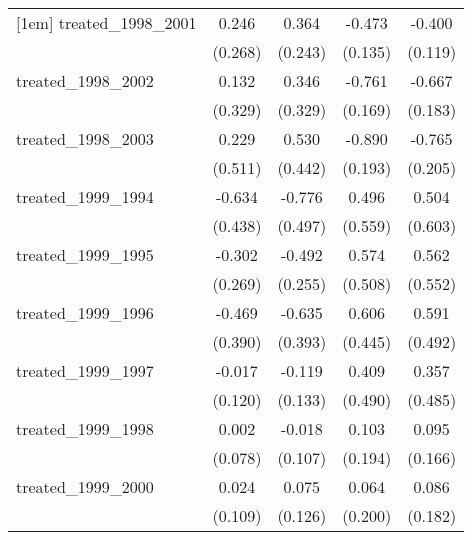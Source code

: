 {\begin{tabular}{l*{4}{c}}
[1em]
treated\_1998\_2001&       0.246         &       0.364         &      -0.473\sym{***}&      -0.400\sym{***}\\
            &     (0.268)         &     (0.243)         &     (0.135)         &     (0.119)         \\
[1em]
treated\_1998\_2002&       0.132         &       0.346         &      -0.761\sym{***}&      -0.667\sym{***}\\
            &     (0.329)         &     (0.329)         &     (0.169)         &     (0.183)         \\
[1em]
treated\_1998\_2003&       0.229         &       0.530         &      -0.890\sym{***}&      -0.765\sym{***}\\
            &     (0.511)         &     (0.442)         &     (0.193)         &     (0.205)         \\
[1em]
treated\_1999\_1994&      -0.634         &      -0.776         &       0.496         &       0.504         \\
            &     (0.438)         &     (0.497)         &     (0.559)         &     (0.603)         \\
[1em]
treated\_1999\_1995&      -0.302         &      -0.492         &       0.574         &       0.562         \\
            &     (0.269)         &     (0.255)         &     (0.508)         &     (0.552)         \\
[1em]
treated\_1999\_1996&      -0.469         &      -0.635         &       0.606         &       0.591         \\
            &     (0.390)         &     (0.393)         &     (0.445)         &     (0.492)         \\
[1em]
treated\_1999\_1997&      -0.017         &      -0.119         &       0.409         &       0.357         \\
            &     (0.120)         &     (0.133)         &     (0.490)         &     (0.485)         \\
[1em]
treated\_1999\_1998&       0.002         &      -0.018         &       0.103         &       0.095         \\
            &     (0.078)         &     (0.107)         &     (0.194)         &     (0.166)         \\
[1em]
treated\_1999\_2000&       0.024         &       0.075         &       0.064         &       0.086         \\
            &     (0.109)         &     (0.126)         &     (0.200)         &     (0.182)         \\

\end{tabular}}
